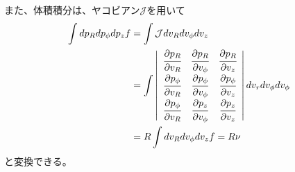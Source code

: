 また、体積積分は、ヤコビアン$\mathcal{J}$を用いて
\begin{align}
\begin{aligned}
	\int dp_R dp_{\phi} dp_z f &= \int \mathcal{J} dv_R dv_{\phi} dv_z\\
	&=
	\int
	\left|
	\begin{array}{ccc}
	 	\cfrac{\partial p_R}{\partial v_R} & \cfrac{\partial p_R}{\partial v_{\phi}} & \cfrac{\partial p_R}{\partial v_z}\\
		\cfrac{\partial p_{\phi}}{\partial v_R} & \cfrac{\partial p_{\phi}}{\partial v_{\phi}} & \cfrac{\partial p_{\phi}}{\partial v_z}\\
		\cfrac{\partial p_{\phi}}{\partial v_R} & \cfrac{\partial p_z}{\partial v_{\phi}} & \cfrac{\partial p_z}{\partial v_z}
	\end{array}
	\right| 
	 dv_r dv_{\phi} dv_{\phi}\\
	&= R \int dv_R dv_{\phi} dv_z f = R \nu    \label{integral_Cylindrical}
\end{aligned}
\end{align}
と変換できる。

